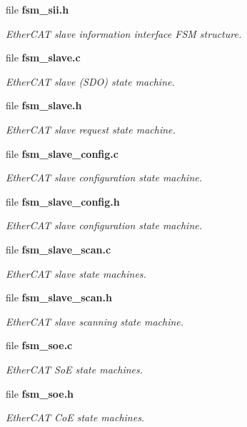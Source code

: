 \begin{DoxyCompactItemize}
file {\bf fsm\-\_\-sii.\-h}
\begin{DoxyCompactList}\small\item\em Ether\-C\-A\-T slave information interface F\-S\-M structure. \end{DoxyCompactList}\item 
file {\bf fsm\-\_\-slave.\-c}
\begin{DoxyCompactList}\small\item\em Ether\-C\-A\-T slave (S\-D\-O) state machine. \end{DoxyCompactList}\item 
file {\bf fsm\-\_\-slave.\-h}
\begin{DoxyCompactList}\small\item\em Ether\-C\-A\-T slave request state machine. \end{DoxyCompactList}\item 
file {\bf fsm\-\_\-slave\-\_\-config.\-c}
\begin{DoxyCompactList}\small\item\em Ether\-C\-A\-T slave configuration state machine. \end{DoxyCompactList}\item 
file {\bf fsm\-\_\-slave\-\_\-config.\-h}
\begin{DoxyCompactList}\small\item\em Ether\-C\-A\-T slave configuration state machine. \end{DoxyCompactList}\item 
file {\bf fsm\-\_\-slave\-\_\-scan.\-c}
\begin{DoxyCompactList}\small\item\em Ether\-C\-A\-T slave state machines. \end{DoxyCompactList}\item 
file {\bf fsm\-\_\-slave\-\_\-scan.\-h}
\begin{DoxyCompactList}\small\item\em Ether\-C\-A\-T slave scanning state machine. \end{DoxyCompactList}\item 
file {\bf fsm\-\_\-soe.\-c}
\begin{DoxyCompactList}\small\item\em Ether\-C\-A\-T So\-E state machines. \end{DoxyCompactList}\item 
file {\bf fsm\-\_\-soe.\-h}
\begin{DoxyCompactList}\small\item\em Ether\-C\-A\-T Co\-E state machines. \end{DoxyCompactList}\item 

\end{DoxyCompactItemize}
